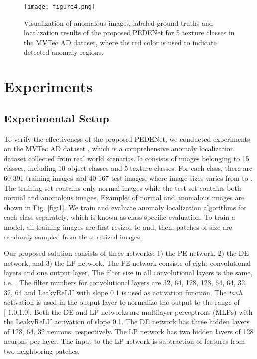 \documentclass{article}
\begin{document}
\begin{figure}[!t]
\centering
\texttt{[image: figure4.png]}
\caption{Visualization of anomalous images, labeled ground truths and
localization results of the proposed PEDENet for 5 texture classes in 
the MVTec AD dataset, where the red color is used to indicate detected 
anomaly regions.} \label{fig:6}
\end{figure}


\section{Experiments}\label{sec:experiments}

\subsection{Experimental Setup}\label{subsec:setup}
To verify the effectiveness of the proposed PEDENet, we conducted
experiments on the MVTec AD dataset \cite{bergmann2019mvtec}, which is
a comprehensive anomaly localization dataset collected from real world
scenarios. It consists of images belonging to 15 classes, including 10
object classes and 5 texture classes. For each class, there are 60-391
training images and 40-167 test images, where image sizes varies from
 to . The training set contains only
normal images while the test set contains both normal and anomalous
images. Examples of normal and anomalous images are shown in Fig.
\ref{fig:1}. We train and evaluate anomaly localization algorithms for
each class separately, which is known as class-specific evaluation.  To
train a model, all training images are first resized to 
and, then, patches of size  are randomly sampled from these
resized images. 

Our proposed solution consists of three networks: 1) the PE network, 2)
the DE network, and 3) the LP network. The PE network consists of eight
convolutional layers and one output layer. The filter size in all
convolutional layers is the same, i.e. . The filter numbers
for convolutional layers are 32, 64, 128, 128, 64, 64, 32, 32, 64 and
LeakyReLU \cite{he2015delving} with slope 0.1 is used as activation
function.  The {\em tanh} activation is used in the output layer to
normalize the output to the range of [-1.0,1.0]. Both the DE and LP
networks are multilayer perceptrons (MLPs) with the LeakyReLU activation
of slope 0.1.  The DE network has three hidden layers of 128, 64, 32
neurons, respectively. The LP network has two hidden layers of 128
neurons per layer. The input to the LP network is subtraction of
features from two neighboring patches. 
\end{document}
